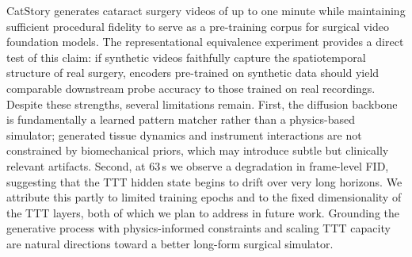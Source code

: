 \documentclass[runningheads]{llncs}
\begin{document}
CatStory generates cataract surgery videos of up to one minute while maintaining sufficient procedural fidelity to serve as a pre-training corpus for surgical video foundation models. The representational equivalence experiment provides a direct test of this claim: if synthetic videos faithfully capture the spatiotemporal structure of real surgery, encoders pre-trained on synthetic data should yield comparable downstream probe accuracy to those trained on real recordings.
Despite these strengths, several limitations remain. First, the diffusion backbone is fundamentally a learned pattern matcher rather than a physics-based simulator; generated tissue dynamics and instrument interactions are not constrained by biomechanical priors, which may introduce subtle but clinically relevant artifacts. Second, at 63\,s we observe a degradation in frame-level FID, suggesting that the TTT hidden state begins to drift over very long horizons. We attribute this partly to limited training epochs and to the fixed dimensionality of the TTT layers, both of which we plan to address in future work. Grounding the generative process with physics-informed constraints and scaling TTT capacity are natural directions toward a better long-form surgical simulator.
%
%
%


\end{document}
